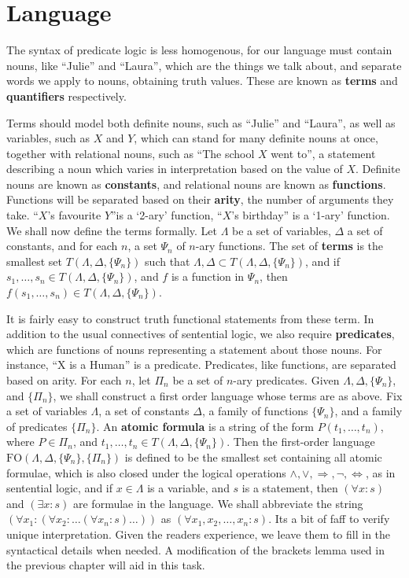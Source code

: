 \section{Language}

The syntax of predicate logic is less homogenous, for our language must contain nouns, like ``Julie'' and ``Laura'', which are the things we talk about, and separate words we apply to nouns, obtaining truth values. These are known as {\bf terms} and {\bf quantifiers} respectively.

Terms should model both definite nouns, such as ``Julie'' and ``Laura'', as well as variables, such as $X$ and $Y$, which can stand for many definite nouns at once, together with relational nouns, such as ``The school $X$ went to'', a statement describing a noun which varies in interpretation based on the value of $X$. Definite nouns are known as {\bf constants}, and relational nouns are known as {\bf functions}. Functions will be separated based on their {\bf arity}, the number of arguments they take. ``$X$'s favourite $Y$''is a `2-ary' function, ``$X$'s birthday'' is a `1-ary' function. We shall now define the terms formally. Let $\Lambda$ be a set of variables, $\Delta$ a set of constants, and for each $n$, a set $\Psi_n$ of $n$-ary functions. The set of {\bf terms} is the smallest set $T(\Lambda, \Delta, \{ \Psi_n \})$ such that $\Lambda, \Delta \subset T(\Lambda, \Delta, \{ \Psi_n \})$, and if $s_1, \dots, s_n \in T(\Lambda, \Delta, \{ \Psi_n \})$, and $f$ is a function in $\Psi_n$, then $f(s_1, \dots, s_n) \in T(\Lambda, \Delta, \{ \Psi_n \})$.

It is fairly easy to construct truth functional statements from these term. In addition to the usual connectives of sentential logic, we also require {\bf predicates}, which are functions of nouns representing a statement about those nouns. For instance, ``X is a Human'' is a predicate. Predicates, like functions, are separated based on arity. For each $n$, let $\Pi_n$ be a set of $n$-ary predicates. Given $\Lambda, \Delta, \{ \Psi_n \}$, and $\{ \Pi_n \}$, we shall construct a first order language whose terms are as above. Fix a set of variables $\Lambda$, a set of constants $\Delta$, a family of functions $\{ \Psi_n \}$, and a family of predicates $\{ \Pi_n \}$. An {\bf atomic formula} is a string of the form $P(t_1, \dots, t_n)$, where $P \in \Pi_n$, and $t_1, \dots, t_n \in T(\Lambda, \Delta, \{ \Psi_n \})$. Then the first-order language $\text{FO}(\Lambda, \Delta, \{ \Psi_n \}, \{ \Pi_n \})$ is defined to be the smallest set containing all atomic formulae, which is also closed under the logical operations $\wedge, \vee, \Rightarrow, \neg, \Leftrightarrow$, as in sentential logic, and if $x \in \Lambda$ is a variable, and $s$ is a statement, then $(\forall x: s)$ and $(\exists x: s)$ are formulae in the language. We shall abbreviate the string $(\forall x_1 : (\forall x_2: \dots (\forall x_n: s)\dots))$ as $(\forall x_1, x_2, \dots, x_n : s)$. Its a bit of faff to verify unique interpretation. Given the readers experience, we leave them to fill in the syntactical details when needed. A modification of the brackets lemma used in the previous chapter will aid in this task.

